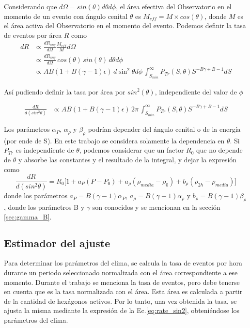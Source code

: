 Considerando que $d\Omega= sin(\theta)d\theta d\phi$, el área efectiva del Observatorio  en el momento de un evento con ángulo cenital $\theta$ es $M_{eff}=M\times cos(\theta)$, donde $M$ es el área activa del Observatorio en el momento del evento. Podemos definir la tasa de eventos por área $R$ como
\begin{align*}
	dR 	&\propto \frac{dR_{ang}}{d\Omega} \frac{M_{eff}}{M} d\Omega \\
		&\propto \frac{dR_{ang}}{d\Omega}\, cos(\theta)\, sin(\theta)\,d\theta d\phi\\
		&\propto  AB(1+B(\gamma - 1)\epsilon)\,d\sin^2\theta d\phi\,\int_{S_{min}}^{\infty} P_{Tr}(S,\theta) S^{-B\gamma +B -1} dS
\end{align*}

Así pudiendo definir la tasa por área por $sin^2(\theta)$, independiente del valor de $\phi$

\begin{align*}
	\frac{dR}{d(sin^2\theta)} &\propto AB(1+B(\gamma-1)\epsilon)\, 2\pi \,\int_{S_{min}}^{\infty} P_{Tr}(S,\theta) S^{-B\gamma +B -1} dS
\end{align*}

Los parámetros $\alpha_P$, $\alpha_{\rho}$ y $\beta_{\rho}$ podrían depender del ángulo cenital o de la energía (por ende de S). En este trabajo se considera solamente la dependencia en $\theta$. Si $P_{Tr}$ es independiente de $\theta$, podemos considerar que un factor $R_0$ que no depende de $\theta$  y absorbe las constantes y el resultado de la integral, y dejar la expresión como
\begin{equation}
	\frac{dR}{d(sin^2\theta)} = R_0\bigg[1+a_P(P-P_0) +a_{\rho}(\rho_{media}-\rho_0) + b_{\rho}(\rho_{2h}-\rho_{media})\bigg] 
	\label{eq:rate_sin2}
\end{equation}
donde los parámetros $a_P=B(\gamma-1)\alpha_{P}$, $a_{\rho}=B(\gamma-1)\alpha_{\rho}$ y $b_{\rho}=B(\gamma-1)\beta_{\rho}$, donde los parámetros B y $\gamma$ son conocidos y se mencionan en la sección \ref{sec:gamma_B}.

\subsection{Estimador del ajuste}

Para determinar los parámetros del clima, se calcula la tasa de eventos por hora durante un periodo seleccionado normalizada con el área correspondiente a ese momento. Durante el trabajo se menciona la tasa de eventos, pero debe tenerse en cuenta que es la tasa normalizada con el área. Esta área es calculada a partir de la cantidad de hexágonos activos. Por lo tanto, una vez obtenida la tasa, se ajusta la misma mediante la expresión de la Ec.\ref{eq:rate_sin2}, obteniéndose los parámetros del clima.

